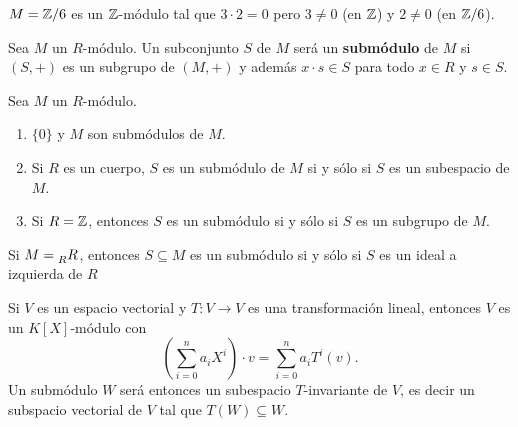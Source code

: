 \begin{example}
$M=\mathbb{Z}/6$ es un $\mathbb{Z}$-módulo tal que $3\cdot 2=0$ pero $3\ne 0$ (en $\mathbb{Z}$) y $2\ne 0$ (en $\mathbb{Z}/6$).  
\end{example}

\begin{definition}
	Sea $M$ un $R$-módulo. Un subconjunto $S$ de $M$ será un \textbf{submódulo} de $M$ si $(S,+)$ es un subgrupo de $(M,+)$ y además
	$x\cdot s\in S$ para todo $x\in R$ y $s\in S$. 
\end{definition}

\begin{examples}
Sea $M$ un $R$-módulo. 
\begin{enumerate}
\item $\{0\}$ y $M$ son submódulos de $M$.
\item Si $R$ es un cuerpo, $S$ es un submódulo de $M$ si y sólo si $S$ es un subespacio de $M$.
\item Si $R=\mathbb{Z}$, entonces $S$ es un submódulo si y sólo si $S$ es un subgrupo de $M$. 	
\end{enumerate}
\end{examples}

\begin{example}
Si $M=\prescript{}{R}R$, entonces $S\subseteq M$ es un submódulo si y sólo si $S$ es un ideal a izquierda de $R$
\end{example}

\begin{example}
Si $V$ es un espacio vectorial y $T\colon V\to V$ es una transformación lineal, entonces
$V$ es un $K[X]$-módulo con 
\[
\left(\sum_{i=0}^na_iX^i\right)\cdot v=\sum_{i=0}^na_iT^i(v).
\]
Un submódulo $W$ será entonces un subespacio $T$-invariante de $V$, es decir un subspacio vectorial de $V$ 
tal que $T(W)\subseteq W$. 
\end{example}
 

